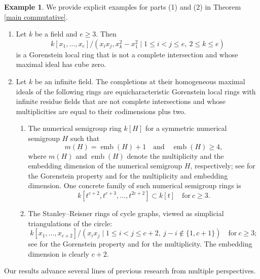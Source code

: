 \documentclass{amsart}
\theoremstyle{definition}
\newtheorem{eg}[thm]{Example}
\theoremstyle{remark}
\numberwithin{equation}{thm}
\def\le{\leqslant}
\def\ge{\geqslant}
\begin{document}
\begin{eg}\label{examples}
We provide explicit examples for parts (1) and (2) in Theorem \ref{main commutative}.
\begin{enumerate}[{\rm (1)}]
\item Let $k$ be a field and $e\ge 3$. Then 
$$k[x_1,\ldots,x_e]/(x_ix_j, x_k^2-x_1^2 \mid 1\le i<j\le e, \ 2\le k\le e)
$$
is a Gorenstein local ring that is not a complete intersection and whose maximal ideal has cube zero.
\item Let $k$ be an infinite field. The completions at their homogeneous maximal ideals of the following rings are equicharacteristic Gorenstein local rings with infinite residue fields that are not complete intersections and whose multiplicities are equal to their codimensions plus two.
\begin{enumerate}
\item The numerical semigroup ring $k[H]$ for a symmetric numerical semigroup $H$ such that
$$
m(H)=\operatorname{emb}(H)+1
\quad\text{and}\quad
\operatorname{emb}(H)\ge 4,
$$
where $m(H)$ and $\operatorname{emb}(H)$ denote the multiplicity and the embedding dimension of the numerical semigroup $H$, respectively; see \cite[Theorem]{K} for the Gorenstein property and \cite[Proposition 1(1) and (2)]{W} for the multiplicity and embedding dimension.
One concrete family of such numerical semigroup rings is
$$
k[t^{c+2},t^{c+3},\ldots,t^{2c+2}]\subset k[t] \quad \text{for}\ c\ge 3.
$$
\item The Stanley--Reisner rings of cycle graphs, viewed as simplicial triangulations of the circle:
$$
k[x_1,\ldots,x_{c+2}]/
(x_ix_j \mid 1\le i<j\le c+2,\ j-i\notin{\{1,c+1\}})\quad \text{for}\ c\ge 3;
$$
see \cite[Corollary 5.6.5]{BH} for the Gorenstein property
and \cite[Lemma 5.1.8 and Corollary 5.1.9]{BH} for the multiplicity. The embedding dimension is clearly $c+2$.
\end{enumerate}
\end{enumerate}
\end{eg}


Our results advance several lines of previous research from multiple perspectives.
\end{document}
